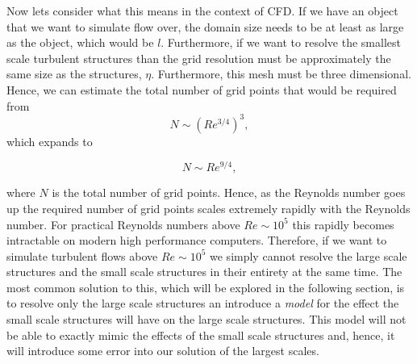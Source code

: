 Now lets consider what this means in the context of CFD. If we have an object that we want to simulate flow over, the domain size needs to be at least as large as the object, which would be $l$. Furthermore, if we want to resolve the smallest scale turbulent structures than the grid resolution must be approximately the same size as the structures, $\eta$. Furthermore, this mesh must be three dimensional. Hence, we can estimate the total number of grid points that would be required from
\begin{equation}
	N \sim \left(Re^{3/4}\right)^3,
\end{equation}
which expands to
\begin{eqBox}
\begin{equation}
	N \sim Re^{9/4},
\end{equation}
\end{eqBox}
where $N$ is the total number of grid points. Hence, as the Reynolds number goes up the required number of grid points scales extremely rapidly with the Reynolds number. For practical Reynolds numbers above $Re \sim 10^5$ this rapidly becomes intractable on modern high performance computers. Therefore, if we want to simulate turbulent flows above $Re \sim 10^5$ we simply cannot resolve the large scale structures and the small scale structures in their entirety at the same time. The most common solution to this, which will be explored in the following section, is to resolve only the large scale structures an introduce a {\it model} for the effect the small scale structures will have on the large scale structures. This model will not be able to exactly mimic the effects of the small scale structures and, hence, it will introduce some error into our solution of the largest scales.

